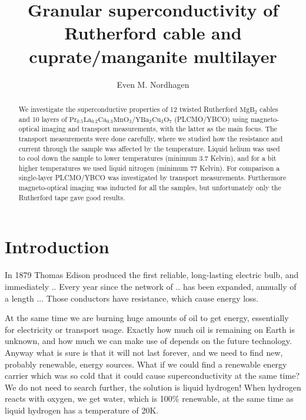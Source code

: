\documentclass{comjnl}
\newcommand*\chem[1]{\ensuremath{\mathrm{#1}}}
\begin{document}
\title[Granular superconductivity of Rutherford cable and cuprate/manganite multilayer]{Granular superconductivity of Rutherford cable and cuprate/manganite multilayer}
\author{Even M. Nordhagen}
 

 




\begin{abstract}
We investigate the superconductive properties of 12 twisted Rutherford \chem{MgB_2} cables and 10 layers of \chem{Pr_{0.5}La_{0.2}Ca_{0.3}MnO_3/YBa_2Cu_3O_7} (PLCMO/YBCO) using magneto-optical imaging and transport measurements, with the latter as the main focus. The transport measurements were done carefully, where we studied how the resistance and current through the sample was affected by the temperature. Liquid helium was used to cool down the sample to lower temperatures (minimum 3.7 Kelvin), and for a bit higher temperatures we used liquid nitrogen (minimum 77 Kelvin). For comparison a single-layer PLCMO/YBCO was investigated by transport measurements. Furthermore magneto-optical imaging was inducted for all the samples, but unfortunately only the Rutherford tape gave good results.
\end{abstract}

\maketitle


\section{Introduction}
In 1879 Thomas Edison produced the first reliable, long-lasting electric bulb, and immediately .. Every year since the network of .. has been expanded, annually of a length ... Those conductors have resistance, which cause energy loss. 

At the same time we are burning huge amounts of oil to get energy, essentially for electricity or transport usage. Exactly how much oil is remaining on Earth is unknown, and how much we can make use of depends on the future technology. Anyway what is sure is that it will not last forever, and we need to find new, probably renewable, energy sources. What if we could find a renewable energy carrier which was so cold that it could cause superconductivity at the same time? We do not need to search further, the solution is liquid hydrogen! When hydrogen reacts with oxygen, we get water, which is 100\% renewable, at the same time as liquid hydrogen has a temperature of 20K. 
\end{document}
